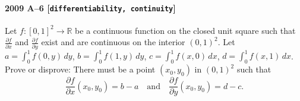 \paragraph{2009 A--6 \textnormal{[\texttt{differentiability, continuity}]}}
Let $f:[0,1]^2 \to \mathbb{R}$ be a continuous function on the closed unit
square such that $\frac{\partial f}{\partial x}$ and $\frac{\partial f}{\partial y}$ exist
and are continuous on the interior $(0,1)^2$. Let $a = \int_0^1 f(0,y)\,dy$,
$b = \int_0^1 f(1,y)\,dy$, $c = \int_0^1 f(x,0)\,dx$, $d = \int_0^1 f(x,1)\,dx$.
Prove or disprove: There must be a point $(x_0,y_0)$ in $(0,1)^2$ such that
\[
\frac{\partial f}{\partial x} (x_0,y_0) = b - a
\quad \mbox{and} \quad
\frac{\partial f}{\partial y} (x_0,y_0) = d - c.
\]
